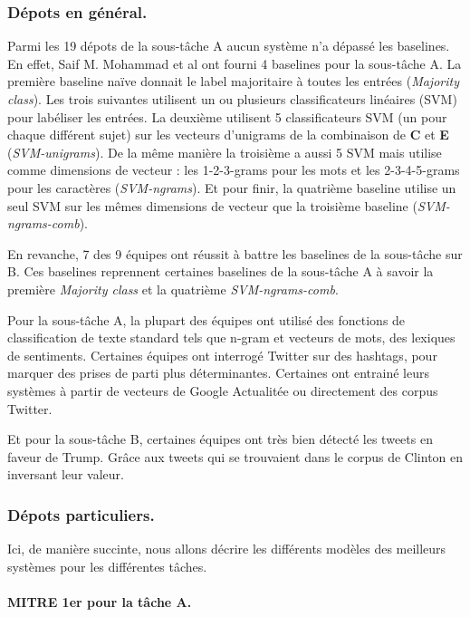 \documentclass[11pt,a4paper,oldfontcommands]{memoir}
\begin{document}
\subsubsection{Dépots en général.}
Parmi les 19 dépots de la sous-tâche A aucun système n'a dépassé les baselines.
En effet, Saif M.
Mohammad et al ont fourni 4 baselines pour la sous-tâche A.
La première baseline naïve donnait le label majoritaire à toutes les entrées (\textit{Majority class}).
Les trois suivantes utilisent un ou plusieurs classificateurs linéaires (SVM) pour labéliser les entrées.
La deuxième utilisent 5 classificateurs SVM (un pour chaque différent sujet) sur les vecteurs d'unigrams de la combinaison de \textbf{C} et \textbf{E} (\textit{SVM-unigrams}).
De la même manière la troisième a aussi 5 SVM mais utilise comme dimensions de vecteur :
les 1-2-3-grams pour les mots et les 2-3-4-5-grams pour les caractères (\textit{SVM-ngrams}).
Et pour finir, la quatrième baseline utilise un seul SVM sur les mêmes dimensions de vecteur que la troisième baseline (\textit{SVM-ngrams-comb}).

En revanche, 7 des 9 équipes ont réussit à battre les baselines de la sous-tâche sur B.
Ces baselines reprennent certaines baselines de la sous-tâche A à savoir la première  \textit{Majority class} et la quatrième \textit{SVM-ngrams-comb}.

Pour la sous-tâche A, la plupart des équipes ont utilisé des fonctions de classification de texte standard tels que n-gram et vecteurs de mots, des lexiques de sentiments.
Certaines équipes ont interrogé Twitter sur des hashtags, pour marquer des prises de parti plus déterminantes.
Certaines ont entrainé leurs systèmes à partir de  vecteurs de Google Actualitée ou directement des corpus Twitter.

Et pour la sous-tâche B, certaines équipes ont très bien détecté les tweets en faveur
de Trump. Grâce aux tweets qui se trouvaient dans le corpus de Clinton en inversant leur valeur.

\subsubsection{Dépots particuliers.}
Ici, de manière succinte, nous allons décrire les différents modèles des meilleurs systèmes pour les différentes tâches.

\paragraph{MITRE 1er pour la tâche A.}
\end{document}
